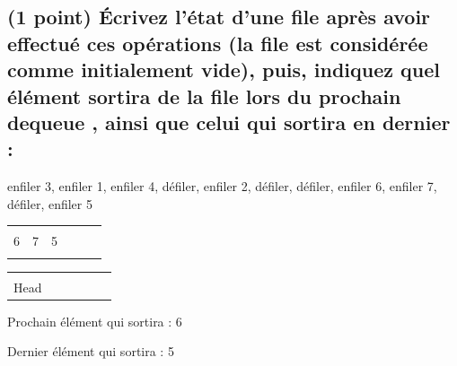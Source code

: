 \documentclass[11pt,a4paper]{article}
\begin{document}
\subsection{(1 point) \'Ecrivez l'état d'une file après avoir effectué ces opérations (la file est considérée comme initialement vide), puis, indiquez quel élément sortira de la file lors du prochain \og dequeue \fg{}, ainsi que celui qui sortira en dernier : }

\bigskip

\begin{center}

\begin{large}
enfiler 3, enfiler 1, enfiler 4, défiler, enfiler 2, défiler, défiler, enfiler 6, enfiler 7, défiler, enfiler 5
\end{large}

\bigskip

\begin{tabular}{ | C{1cm} | C{1cm} | C{1cm} | C{1cm} | C{1cm} | C{1cm} | }
  \hline
     &    &    &    &    &    \\
   6  &  7  &  5  &    &    &    \\
     &    &    &    &    &    \\
  \hline
\end{tabular}

\smallskip

\begin{tabular}{   C{1cm}   C{1cm}   C{1cm}   C{1cm}   C{1cm}   C{1cm}   }
   &  &  &  &  &  \\
  Head &  &  &  &  &  \\
\end{tabular}


\begin{table}[ht!]
  \begin{minipage}{0.50\textwidth}

Prochain élément qui sortira : \hspace*{1cm} 6

  \end{minipage}
  \hfillx
  \begin{minipage}{0.50\textwidth}

Dernier élément qui sortira : \hspace*{1cm} 5

  \end{minipage}
\end{table}
\end{center}
\end{document}
